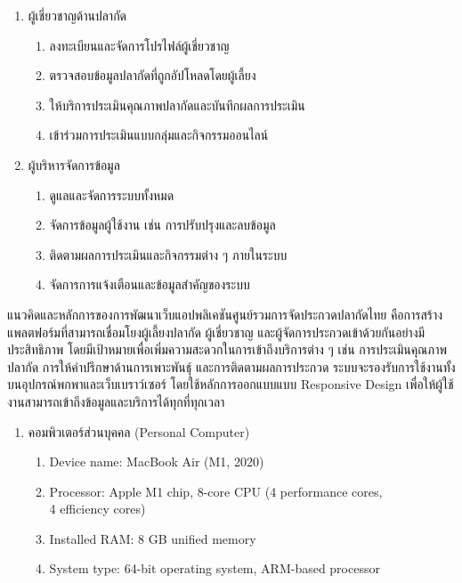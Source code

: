 \begin{enumerate}
	\item ผู้เชี่ยวชาญด้านปลากัด
	\begin{enumerate}
		\item ลงทะเบียนและจัดการโปรไฟล์ผู้เชี่ยวชาญ
		\item ตรวจสอบข้อมูลปลากัดที่ถูกอัปโหลดโดยผู้เลี้ยง
		\item ให้บริการประเมินคุณภาพปลากัดและบันทึกผลการประเมิน
		\item เข้าร่วมการประเมินแบบกลุ่มและกิจกรรมออนไลน์
	\end{enumerate}
\newpage
	\item ผู้บริหารจัดการข้อมูล
	\begin{enumerate}
		\item ดูแลและจัดการระบบทั้งหมด
		\item จัดการข้อมูลผู้ใช้งาน เช่น การปรับปรุงและลบข้อมูล
		\item ติดตามผลการประเมินและกิจกรรมต่าง ๆ ภายในระบบ
		\item จัดการการแจ้งเตือนและข้อมูลสำคัญของระบบ
	\end{enumerate}
\end{enumerate}

\vspace{\baselineskip}

\par
\indent แนวคิดและหลักการของการพัฒนาเว็บแอปพลิเคชันศูนย์รวมการจัดประกวดปลากัดไทย
คือการสร้างแพลตฟอร์มที่สามารถเชื่อมโยงผู้เลี้ยงปลากัด ผู้เชี่ยวชาญ และผู้จัดการประกวดเข้าด้วยกันอย่างมีประสิทธิภาพ
โดยมีเป้าหมายเพื่อเพิ่มความสะดวกในการเข้าถึงบริการต่าง ๆ เช่น การประเมินคุณภาพปลากัด การให้คำปรึกษาด้านการเพาะพันธุ์
และการติดตามผลการประกวด ระบบจะรองรับการใช้งานทั้งบนอุปกรณ์พกพาและเว็บเบราว์เซอร์ โดยใช้หลักการออกแบบแบบ
Responsive Design เพื่อให้ผู้ใช้งานสามารถเข้าถึงข้อมูลและบริการได้ทุกที่ทุกเวลา

\vspace{\baselineskip}

\par

\begin{enumerate}
	\item คอมพิวเตอร์ส่วนบุคคล (Personal Computer)
	\begin{enumerate}
		\item Device name: MacBook Air (M1, 2020)
		\item Processor: Apple M1 chip, 8-core CPU (4 performance cores,\\4 efficiency cores)
		\item Installed RAM: 8 GB unified memory
		\item System type: 64-bit operating system, ARM-based processor
	\end{enumerate}
\end{enumerate}

\par\endgroup
\clearpage
\clearpage
